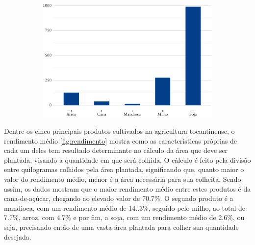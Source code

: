\begin{figure}[!h]
\begin{subfigure}{\linewidth}
		\includegraphics{fig/area_plantada-1.pdf}
		\label{fig:areaplantada}
	\end{subfigure}
\end{figure}

\par Dentre os cinco principais produtos cultivados na agricultura tocantinense, o rendimento médio \ref{fig:rendimento} mostra como as características próprias de cada um deles tem resultado determinante no cálculo da área que deve ser plantada, visando a quantidade em que será colhida. O cálculo é feito pela divisão entre quilogramas colhidos pela área plantada, significando que, quanto maior o valor do rendimento médio, menor é a área necessária para sua colheita. Sendo assim, os dados mostram que o maior rendimento médio entre estes produtos é da cana-de-açúcar, chegando ao elevado valor de 70.7\%. O segundo produto é a mandioca, com um rendimento médio de 14..3\%, seguido pelo milho, ao total de 7.7\%, arroz, com 4.7\% e por fim, a soja, com um rendimento médio de 2.6\%, ou seja, precisando então de uma vasta área plantada para colher sua quantidade desejada. 

